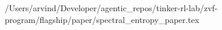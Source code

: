 /Users/arvind/Developer/agentic_repos/tinker-rl-lab/zvf-program/flagship/paper/spectral_entropy_paper.tex